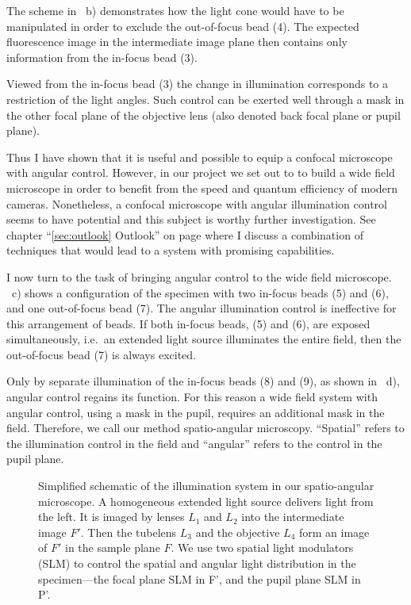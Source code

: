 The scheme in ~b) demonstrates how the light
cone would have to be manipulated in order to exclude the out-of-focus
bead (4). The expected fluorescence image in the intermediate image
plane then contains only information from the in-focus bead (3).

Viewed from the in-focus bead (3) the change in illumination
corresponds to a restriction of the light angles. Such control can be
exerted well through a mask in the other focal plane of the objective
lens (also denoted back focal plane or pupil plane).

Thus I have shown that it is useful and possible to equip a confocal
microscope with angular control. However, in our project we set out to
to build a wide field microscope in order to benefit from the speed
and quantum efficiency of modern cameras.  Nonetheless, a confocal
microscope with angular illumination control seems to have potential
and this subject is worthy further investigation.  See chapter
``\ref{sec:outlook} Outlook'' on page \pageref{sec:outlook} where I
discuss a combination of techniques that would lead to a system with
promising capabilities.

I now turn to the task of bringing angular control to the wide field
microscope. ~c) shows a configuration of the
specimen with two in-focus beads (5) and (6), and one out-of-focus
bead (7).  The angular illumination control is ineffective for this
arrangement of beads.  If both in-focus beads, (5) and (6), are
exposed simultaneously, i.e.\ an extended light source illuminates the
entire field, then the out-of-focus bead (7) is always excited.

Only by separate illumination of the in-focus beads (8) and (9), as
shown in ~d), angular control regains its
function. For this reason a wide field system with angular control,
using a mask in the pupil, requires an additional mask in the field.
Therefore, we call our method spatio-angular microscopy. ``Spatial''
refers to the illumination control in the field and ``angular'' refers
to the control in the pupil plane.


\begin{figure}[!hbt] \centering {}
  \caption{Simplified schematic of the illumination system in our
spatio-angular microscope. A homogeneous extended light source
delivers light from the left. It is imaged by lenses $L_1$ and $L_2$
into the intermediate image $F'$. Then the tubelens $L_3$ and the
objective $L_4$ form an image of $F'$ in the sample plane $F$. We use
two spatial light modulators (SLM) to control the spatial and angular
light distribution in the specimen---the focal plane SLM in F', and
the pupil plane SLM in P'.}
  \label{fig:memi-simple}
\end{figure}

